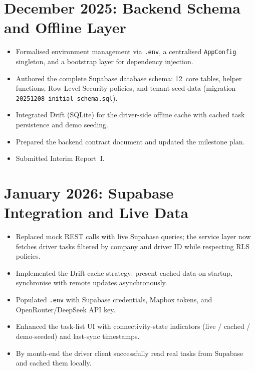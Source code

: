 \section*{December 2025: Backend Schema and Offline Layer}

\begin{itemize}
  \item Formalised environment management via \texttt{.env}, a centralised \texttt{AppConfig}
        singleton, and a bootstrap layer for dependency injection.
  \item Authored the complete Supabase database schema: 12~core tables, helper functions,
        Row-Level Security policies, and tenant seed data
        (migration \texttt{20251208\_initial\_schema.sql}).
  \item Integrated Drift (SQLite) for the driver-side offline cache with cached task
        persistence and demo seeding.
  \item Prepared the backend contract document and updated the milestone plan.
  \item Submitted Interim Report~I.
\end{itemize}

\section*{January 2026: Supabase Integration and Live Data}

\begin{itemize}
  \item Replaced mock REST calls with live Supabase queries; the service layer now fetches
        driver tasks filtered by company and driver ID while respecting RLS policies.
  \item Implemented the Drift cache strategy: present cached data on startup, synchronise
        with remote updates asynchronously.
  \item Populated \texttt{.env} with Supabase credentials, Mapbox tokens, and
        OpenRouter/DeepSeek API key.
  \item Enhanced the task-list UI with connectivity-state indicators
        (live / cached / demo-seeded) and last-sync timestamps.
  \item By month-end the driver client successfully read real tasks from Supabase and cached
        them locally.
\end{itemize}

